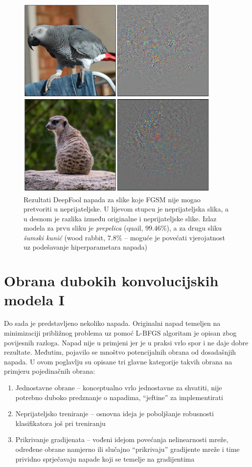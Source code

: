 \documentclass[utf8, diplomski]{fer}
\begin{document}
\begin{figure}[H]
\centering
\includegraphics[width=0.9\textwidth,keepaspectratio]{img/results/deepfool_hard.png}
\caption{Rezultati DeepFool napada za slike koje FGSM nije mogao pretvoriti u neprijateljske. U lijevom stupcu je neprijateljska slika, a u desnom je razlika između originalne i neprijateljske slike. Izlaz modela za prvu sliku je \textit{prepelica} (quail, $99.46\%$), a za drugu sliku \textit{šumski kunić} (wood rabbit, $7.8\%$ -- moguće je povećati vjerojatnost uz podešavanje hiperparametara napada)}
\end{figure}\label{deepfool_hard}


\chapter{Obrana dubokih konvolucijskih modela I}
Do sada je predstavljeno nekoliko napada. Originalni napad temeljen na minimizaciji približnog problema uz pomoć L-BFGS algoritam je opisan zbog povijesnih razloga. Napad nije u primjeni jer je u praksi vrlo spor i ne daje dobre rezultate. Međutim, pojavilo se mnoštvo potencijalnih obrana od dosadašnjih napada. U ovom poglavlju su opisane tri glavne kategorije takvih obrana na primjeru pojedinačnih obrana: 
\begin{enumerate}[noitemsep, label=\textbullet]
\item Jednostavne obrane -- konceptualno vrlo jednostavne za shvatiti, nije potrebno duboko predznanje o napadima, ``jeftine'' za implementirati
\item Neprijateljsko treniranje -- osnovna ideja je poboljšanje robusnosti klasifikatora još pri treniranju
\item Prikrivanje gradijenata -- vođeni idejom povećanja nelinearnosti mreže, određene obrane namjerno ili slučajno ``prikrivaju'' gradijente mreže i time prividno sprječavaju napade koji se temelje na gradijentima
\end{enumerate}
\end{document}

